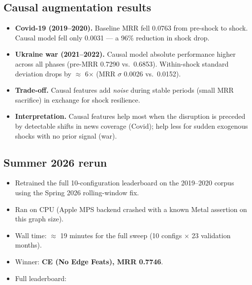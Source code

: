 \documentclass[11pt]{article}
\begin{document}
\subsection{Causal augmentation results}
\begin{itemize}
  \item \textbf{Covid-19 (2019--2020).} Baseline MRR fell 0.0763 from pre-shock to shock. Causal model fell only 0.0031 --- a 96\% reduction in shock drop.
  \item \textbf{Ukraine war (2021--2022).} Causal model absolute performance higher across all phases (pre-MRR 0.7290 vs.\ 0.6853). Within-shock standard deviation drops by \(\approx\) 6\(\times\) (MRR \(\sigma\) 0.0026 vs.\ 0.0152).
  \item \textbf{Trade-off.} Causal features add \emph{noise} during stable periods (small MRR sacrifice) in exchange for shock resilience.
  \item \textbf{Interpretation.} Causal features help most when the disruption is preceded by detectable shifts in news coverage (Covid); help less for sudden exogenous shocks with no prior signal (war).
\end{itemize}

\subsection{Summer 2026 rerun}
\begin{itemize}
  \item Retrained the full 10-configuration leaderboard on the 2019--2020 corpus using the Spring 2026 rolling-window fix.
  \item Ran on CPU (Apple MPS backend crashed with a known Metal assertion on this graph size).
  \item Wall time: \(\approx\) 19 minutes for the full sweep (10 configs \(\times\) 23 validation months).
  \item Winner: \textbf{CE (No Edge Feats), MRR 0.7746}.
  \item Full leaderboard:
\end{itemize}
\end{document}

